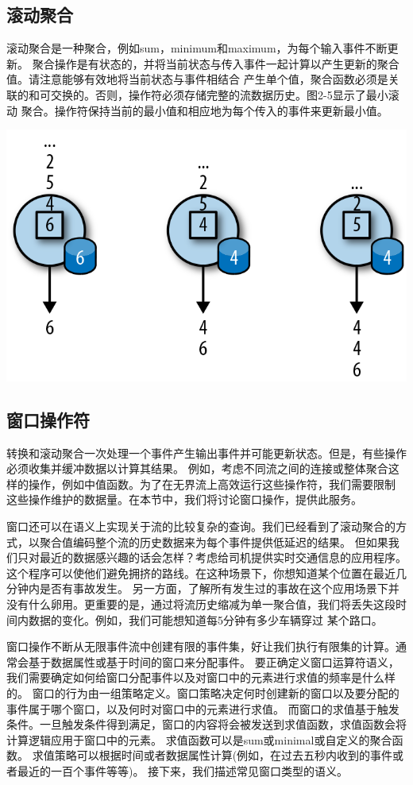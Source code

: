 \documentclass[oneside]{ctexbook}
\begin{document}
\subsection{滚动聚合}

滚动聚合是一种聚合，例如sum，minimum和maximum，为每个输入事件不断更新。
聚合操作是有状态的，并将当前状态与传入事件一起计算以产生更新的聚合值。请注意能够有效地将当前状态与事件相结合
产生单个值，聚合函数必须是关联的和可交换的。否则，操作符必须存储完整的流数据历史。图2-5显示了最小滚动
聚合。操作符保持当前的最小值和相应地为每个传入的事件来更新最小值。

\noindent\includegraphics[width=\textwidth]{spaf_0205.png}

\subsection{窗口操作符}

转换和滚动聚合一次处理一个事件产生输出事件并可能更新状态。但是，有些操作必须收集并缓冲数据以计算其结果。
例如，考虑不同流之间的连接或整体聚合这样的操作，例如中值函数。为了在无界流上高效运行这些操作符，我们需要限制
这些操作维护的数据量。在本节中，我们将讨论窗口操作，提供此服务。

窗口还可以在语义上实现关于流的比较复杂的查询。我们已经看到了滚动聚合的方式，以聚合值编码整个流的历史数据来为每个事件提供低延迟的结果。
但如果我们只对最近的数据感兴趣的话会怎样？考虑给司机提供实时交通信息的应用程序。这个程序可以使他们避免拥挤的路线。在这种场景下，你想知道某个位置在最近几分钟内是否有事故发生。
另一方面，了解所有发生过的事故在这个应用场景下并没有什么卵用。更重要的是，通过将流历史缩减为单一聚合值，我们将丢失这段时间内数据的变化。例如，我们可能想知道每5分钟有多少车辆穿过
某个路口。

窗口操作不断从无限事件流中创建有限的事件集，好让我们执行有限集的计算。通常会基于数据属性或基于时间的窗口来分配事件。
要正确定义窗口运算符语义，我们需要确定如何给窗口分配事件以及对窗口中的元素进行求值的频率是什么样的。
窗口的行为由一组策略定义。窗口策略决定何时创建新的窗口以及要分配的事件属于哪个窗口，以及何时对窗口中的元素进行求值。
而窗口的求值基于触发条件。一旦触发条件得到满足，窗口的内容将会被发送到求值函数，求值函数会将计算逻辑应用于窗口中的元素。
求值函数可以是sum或minimal或自定义的聚合函数。
求值策略可以根据时间或者数据属性计算(例如，在过去五秒内收到的事件或者最近的一百个事件等等)。
接下来，我们描述常见窗口类型的语义。
\end{document}
